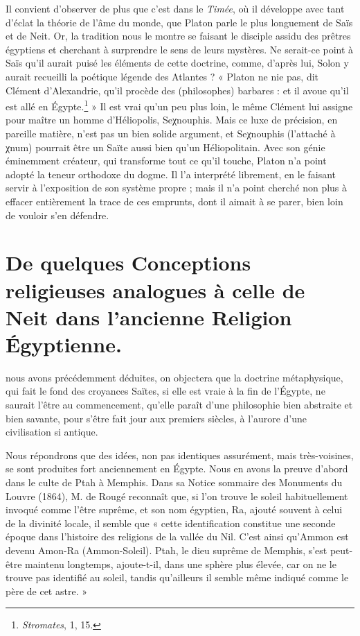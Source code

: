 \documentclass[letterpaper,twocolumn,openany,nodeprecatedcode]{dndbook}
\begin{document}
Il convient d'observer de plus que c'est dans le \emph{Timée}, où il développe avec tant d'éclat la théorie de l'âme du monde, que Platon parle le plus longuement de Saïs et de Neit. Or, la tradition nous le montre se faisant le disciple assidu des prêtres égyptiens et cherchant à surprendre le sens de leurs mystères. Ne serait-ce point à Saïs qu'il aurait puisé les éléments de cette doctrine, comme, d'après lui, Solon y aurait recueilli la poétique légende des Atlantes ? « Platon ne nie pas, dit Clément d'Alexandrie, qu'il procède des (philosophes) barbares : et il avoue qu'il est allé en Égypte.\footnote{\emph{Stromates}, 1, 15.} » Il est vrai qu'un peu plus loin, le même Clément lui assigne pour maître un homme d'Héliopolis, Seχnouphis. Mais ce luxe de précision, en pareille matière, n'est pas un bien solide argument, et Seχnouphis (l'attaché à χnum) pourrait être un Saïte aussi bien qu'un Héliopolitain. Avec son génie éminemment créateur, qui transforme tout ce qu'il touche, Platon n'a point adopté la teneur orthodoxe du dogme. Il l'a interprété librement, en le faisant servir à l'exposition de son système propre ; mais il n'a point cherché non plus à effacer entièrement la trace de ces emprunts, dont il aimait à se parer, bien loin de vouloir s'en défendre.
\clearpage
\chapter{De quelques Conceptions religieuses analogues à celle de Neit dans l'ancienne Religion Égyptienne.}
 nous avons précédemment déduites, on objectera que la doctrine métaphysique, qui fait le fond des croyances Saïtes, si elle est vraie à la fin de l'Égypte, ne saurait l'être au commencement, qu'elle paraît d'une philosophie bien abstraite et bien savante, pour s'être fait jour aux premiers siècles, à l'aurore d'une civilisation si antique.

Nous répondrons que des idées, non pas identiques assurément, mais très-voisines, se sont produites fort anciennement en Égypte. Nous en avons la preuve d'abord dans le culte de Ptah à Memphis. Dans sa Notice sommaire des Monuments du Louvre (1864), M. de Rougé reconnaît que, si l'on trouve le soleil habituellement invoqué comme l'être suprême, et son nom égyptien, Ra, ajouté souvent à celui de la divinité locale, il semble que « cette identification constitue une seconde époque dans l'histoire des religions de la vallée du Nil. C'est ainsi qu'Ammon est devenu Amon-Ra (Ammon-Soleil). Ptah, le dieu suprême de Memphis, s'est peut-être maintenu longtemps, ajoute-t-il, dans une sphère plus élevée, car on ne le trouve pas identifié au soleil, tandis qu'ailleurs il semble même indiqué comme le père de cet astre. »
\end{document}
